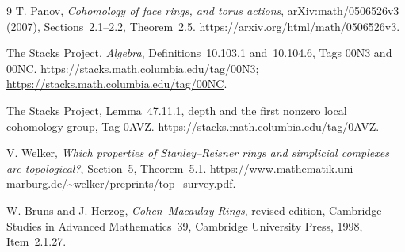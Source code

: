 \documentclass[11pt]{amsart}
\begin{document}
\begin{thebibliography}{9}
T. Panov, \emph{Cohomology of face rings, and torus actions},
arXiv:math/0506526v3 (2007), Sections~2.1--2.2, Theorem~2.5.
\url{https://arxiv.org/html/math/0506526v3}.

The Stacks Project, \emph{Algebra}, Definitions~10.103.1 and~10.104.6,
Tags 00N3 and 00NC.
\url{https://stacks.math.columbia.edu/tag/00N3};
\url{https://stacks.math.columbia.edu/tag/00NC}.

The Stacks Project, Lemma~47.11.1, depth and the first nonzero local
cohomology group, Tag 0AVZ.
\url{https://stacks.math.columbia.edu/tag/0AVZ}.

V. Welker, \emph{Which properties of Stanley--Reisner rings and simplicial
complexes are topological?}, Section~5, Theorem~5.1.
\url{https://www.mathematik.uni-marburg.de/~welker/preprints/top_survey.pdf}.

W. Bruns and J. Herzog, \emph{Cohen--Macaulay Rings}, revised edition,
Cambridge Studies in Advanced Mathematics~39, Cambridge University Press,
1998, Item~2.1.27.
\end{thebibliography}
\end{document}
